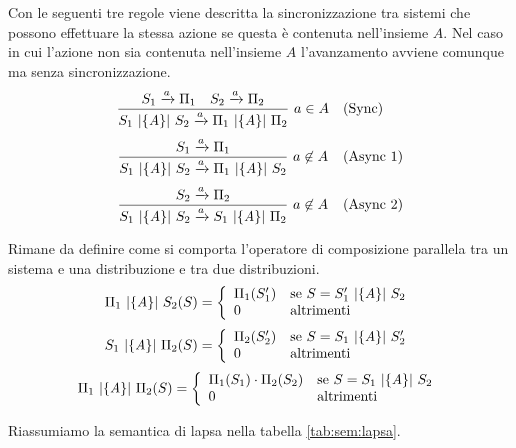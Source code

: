 Con le seguenti tre regole viene descritta la sincronizzazione tra sistemi che possono effettuare la stessa azione se questa è contenuta nell'insieme $A$. Nel caso in cui l'azione non sia contenuta nell'insieme $A$ l'avanzamento avviene comunque ma senza sincronizzazione.
$$
\begin{array}{cl}
	\displaystyle{\frac{S_1 \xrightarrow{a} \Pi_1 \quad S_2 \xrightarrow{a} \Pi_2}{S_1 \mbox{ }|{\{\mathit{A}\}}|\mbox{ }S_2 \xrightarrow{a} \Pi_1 \mbox{ }|{\{\mathit{A}\}}|\mbox{ }\Pi_2}\ a \in A} & \mbox{(Sync)} \\[.5cm]
	\displaystyle{\frac{S_1 \xrightarrow{a} \Pi_1}{S_1 \mbox{ }|{\{\mathit{A}\}}|\mbox{ }S_2 \xrightarrow{a} \Pi_1 \mbox{ }|{\{\mathit{A}\}}|\mbox{ }S_2}\ a \not\in A} & \mbox{(Async\ 1)} \\[.5cm]
	\displaystyle{\frac{S_2 \xrightarrow{a} \Pi_2}{S_1 \mbox{ }|{\{\mathit{A}\}}|\mbox{ }S_2 \xrightarrow{a} S_1 \mbox{ }|{\{\mathit{A}\}}|\mbox{ }\Pi_2}\ a \not\in A} & \mbox{(Async\ 2)} \\
\end{array}
$$

Rimane da definire come si comporta l'operatore di composizione parallela tra un sistema e una distribuzione e tra due distribuzioni.
$$
\Pi_1 \mbox{ }|{\{\mathit{A}\}}|\mbox{ } S_2 (S) = \left\{
\begin{array}{ll}
	\Pi_1(S_1')	& \mbox{se } S = S_1' \mbox{ }|{\{\mathit{A}\}}|\mbox{ } S_2 \\
	0			& \mbox{altrimenti} \\
\end{array}
\right.
$$
$$
S_1 \mbox{ }|{\{\mathit{A}\}}|\mbox{ } \Pi_2 (S) = \left\{
\begin{array}{ll}
	\Pi_2(S_2')	& \mbox{se } S = S_1 \mbox{ }|{\{\mathit{A}\}}|\mbox{ } S_2' \\
	0			& \mbox{altrimenti} \\
\end{array}
\right.
$$
$$
\Pi_1 \mbox{ }|{\{\mathit{A}\}}|\mbox{ } \Pi_2 (S) = \left\{
\begin{array}{ll}
	\Pi_1(S_1)\cdot\Pi_2(S_2)	& \mbox{se } S = S_1 \mbox{ }|{\{\mathit{A}\}}|\mbox{ } S_2 \\
	0			& \mbox{altrimenti} \\
\end{array}
\right.
$$

Riassumiamo la semantica di \ac{lapsa} nella tabella \ref{tab:sem:lapsa}.

